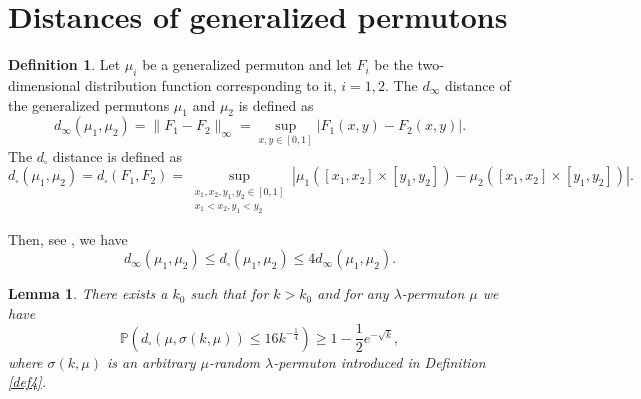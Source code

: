 \documentclass[12pt,twoside]{article}
\theoremstyle{definition}
\newtheorem{definition}[theorem]{Definition}
\theoremstyle{remark}
\numberwithin{equation}{section}
\theoremstyle{plain}
\newtheorem{lem}{Lemma}[section]
\theoremstyle{remark}
\def\P{{\mathbb {P}}}                       \def\Q{{\mathbb {Q}}}
\begin{document}
\section{Distances of generalized permutons} \label{distances}
\setcounter{equation}{0}
%

\begin{definition}  \label{def4+}
Let $\mu_i$ be a generalized permuton and let $F_i$ be the two-dimensional distribution function 
corresponding to it, $i=1,2$.
The $d_\infty$  distance of the generalized permutons $\mu_1$ and $\mu_2$ is defined as
\begin{equation} \label{H33}
d_\infty(\mu_1,\mu_2)
=\|F_1-F_2 \|_\infty =
\sup_{x,y\in[0,1]} |F_1(x,y) -F_2(x,y)|.
\end{equation}
The $d_\square$  distance is defined as
\begin{equation} \label{H32}
d_\square (\mu_1,\mu_2)
=d_\square(F_1, F_2 )=
\sup_{\substack{x_1, x_2, y_1, y_2 \in[0,1] \\ x_1 <x_2, y_1< y_2}} 
|\mu_1([x_1, x_2] \times [ y_1, y_2]) - \mu_2([x_1, x_2] \times [ y_1, y_2])|.
\end{equation}
\end{definition}

Then, see \cite{Hoppen}, we have
\begin{equation} \label{H34}
d_\infty(\mu_1,\mu_2) \le d_\square (\mu_1,\mu_2) \le 4 d_\infty(\mu_1,\mu_2) .
\end{equation}
%

\begin{lem}  \label{H4.2}
There exists a $k_0$ such that for $k> k_0$ and for any $\lambda$-permuton $\mu$ we have
\begin{equation} \label{H37}
\P \left( d_\square \left(\mu, \sigma(k, \mu)\right) \le 16 k^{-\frac{1}{4}}   \right)
\ge 1- \frac{1}{2} e^{-\sqrt{k}},
\end{equation}
where $\sigma(k, \mu)$ is an arbitrary $\mu$-random $\lambda$-permuton introduced in Definition \ref{def4}.
\end{lem}
%
\end{document}

